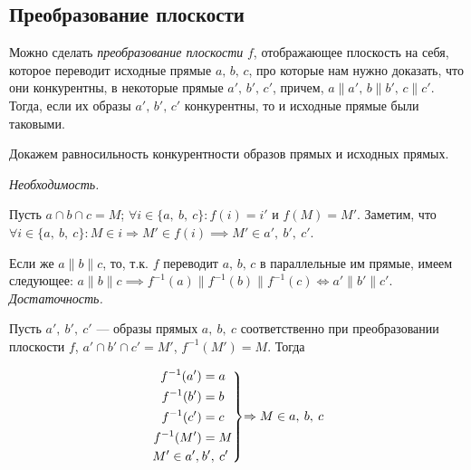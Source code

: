 \documentclass[14pt]{extarticle}
\renewenvironment{rcases}
  {\left.\begin{aligned}}
  {\end{aligned}\right\rbrace}
\begin{document}
\subsection{Преобразование плоскости}
Можно сделать \textit{преобразование плоскости} $f$, отображающее плоскость на себя,
которое переводит исходные прямые \(a, \, b, \, c\), про которые нам нужно доказать,
что они конкурентны, в некоторые прямые \(a', \, b', \, c'\), причем,
\(a \parallel a', \, b \parallel b', \, c \parallel c'\).
Тогда, если их образы \(a', \, b', \, c'\) конкурентны, то и исходные
прямые были таковыми.

Докажем равносильность конкурентности образов прямых и исходных прямых.

\textit{Необходимость.}

Пусть $a \cap b \cap c = M$; $\forall i \in \{a, \: b, \: c\} \mathpunct{:} f(i) = i'$ 
и $f(M) = M'$. Заметим, что $\forall i \in \{a, \: b, \: c\} \mathpunct{:} M \in i 
\Rightarrow M' \in f(i) \implies M' \in a', \:  b', \: c'$. 

Если же $a \parallel b \parallel c$, то, т.к. $f$ переводит \(a, \, b, \, c\)
в параллельные им прямые, имеем следующее: \(a \parallel b \parallel c \implies
f^{-1}(a) \parallel f^{-1}(b) \parallel f^{-1}(c) \iff a' \parallel b' \parallel
c'\).\\


\textit{Достаточность.}

Пусть $a', \: b', \: c'$ --- образы прямых $a, \: b, \: c$ соответственно при
преобразовании плоскости $f$, $a' \cap b' \cap c' = M'$,
$f^{-1}(M') = M$. Тогда 
\begin{ceqn}
\[
\begin{rcases}
	f^{-1}(a') &= a\\
	f^{-1}(b') &= b\\
	f^{-1}(c') &= c\\
	f^{-1}(M') &= M\\
	M' \in a', \: &b' , \: c' \\
\end{rcases}
\text{$\Rightarrow M \in a,\: b, \: c$}
\]
\end{ceqn}

\end{document}
